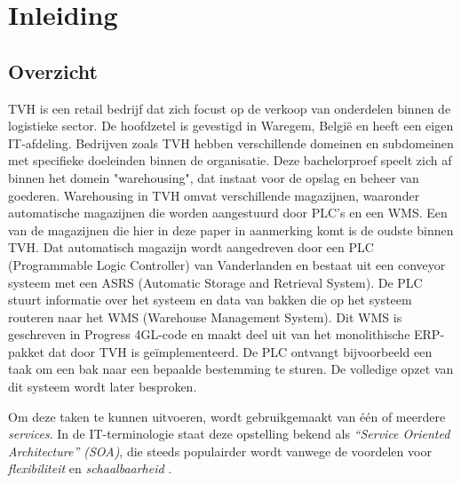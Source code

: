 



\section{Inleiding}%
\label{sec:inleiding}

\subsection{Overzicht}

TVH is een retail bedrijf dat zich focust op de verkoop van onderdelen binnen de logistieke sector. 
De hoofdzetel is gevestigd in Waregem, België en heeft een eigen IT-afdeling.
Bedrijven zoals TVH hebben verschillende domeinen en subdomeinen met specifieke doeleinden binnen de organisatie. 
Deze bachelorproef speelt zich af binnen het domein "warehousing", dat instaat voor de opslag en beheer van goederen. 
Warehousing in TVH omvat verschillende magazijnen, waaronder automatische magazijnen die worden aangestuurd door PLC's en een WMS.
Een van de magazijnen die hier in deze paper in aanmerking komt is de oudste binnen TVH. 
Dat automatisch magazijn wordt aangedreven door een PLC (Programmable Logic Controller) 
van Vanderlanden en bestaat uit een conveyor systeem met een ASRS (Automatic Storage and Retrieval System).
De PLC stuurt informatie over het systeem en data van bakken die op het systeem routeren naar het WMS (Warehouse Management System). 
Dit WMS is geschreven in Progress 4GL-code en maakt deel uit van het monolithische ERP-pakket dat door TVH is geïmplementeerd. 
De PLC ontvangt bijvoorbeeld een taak om een bak naar een bepaalde bestemming te sturen. 
De volledige opzet van dit systeem wordt later besproken.

Om deze taken te kunnen uitvoeren, wordt gebruikgemaakt van één of meerdere \emph{services}. 
In de IT-terminologie staat deze opstelling bekend als \emph{“Service Oriented Architecture” (SOA)}, 
die steeds populairder wordt vanwege de voordelen voor \emph{flexibiliteit} en \emph{schaalbaarheid} \autocite{Bellemare2020}.

